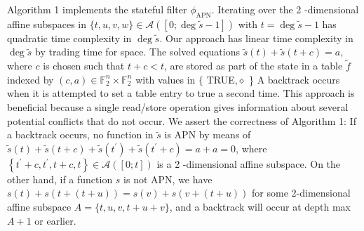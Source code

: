 \documentclass[10pt]{article}
\begin{document}
Algorithm 1 implements the stateful filter $\phi_{\mathrm{APN}}$. Iterating over the 2 -dimensional affine subspaces in $\{t, u, v, w\} \in \mathcal{A}([0 ; \operatorname{deg} \tilde{s}-1])$ with $t=\operatorname{deg} \tilde{s}-1$ has quadratic time complexity in $\operatorname{deg} \tilde{s}$. Our approach has linear time complexity in $\operatorname{deg} \tilde{s}$ by trading time for space. The solved equations $\tilde{s}(t)+\tilde{s}(t+c)=a$, where $c$ is chosen such that $t+c<t$, are stored as part of the state in a table $\tilde{f}$ indexed by $(c, a) \in \mathbb{F}_{2}^{n} \times \mathbb{F}_{2}^{n}$ with values in $\{$ TRUE,$\diamond$ \} A backtrack occurs when it is attempted to set a table entry to true a second time. This approach is beneficial because a single read/store operation gives information about several potential conflicts that do not occur. We assert the correctness of Algorithm 1: If a backtrack occurs, no function in $\tilde{s}$ is APN by means of $\tilde{s}(t)+\tilde{s}(t+c)+\tilde{s}\left(t^{\prime}\right)+\tilde{s}\left(t^{\prime}+c\right)=a+a=0$, where $\left\{t^{\prime}+c, t^{\prime}, t+c, t\right\} \in \mathcal{A}([0 ; t])$ is a 2 -dimensional affine subspace. On the other hand, if a function $s$ is not APN, we have $s(t)+s(t+(t+u))=s(v)+s(v+(t+u))$ for some 2-dimensional affine subspace $A=\{t, u, v, t+u+v\}$, and a backtrack will occur at depth max $A+1$ or earlier.
\end{document}
